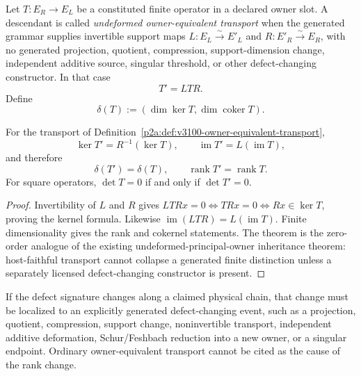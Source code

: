 \documentclass[12pt,a4paper]{article}
\begin{document}
\begin{definition}
\label{p2a:def:v3100-owner-equivalent-transport}
Let $T:E_R\to E_L$ be a constituted finite operator in a declared owner slot.
A descendant is called \emph{undeformed owner-equivalent transport} when the
generated grammar supplies invertible support maps
$L:E_L\overset{\sim}{\to}E'_L$ and
$R:E'_R\overset{\sim}{\to}E_R$, with no generated projection, quotient,
compression, support-dimension change, independent additive source, singular
threshold, or other defect-changing constructor.  In that case
\[
  T'=LTR.
\]
Define
\[
 \delta(T):=(\dim\ker T,\dim\operatorname{coker}T).
\]
\end{definition}

\begin{theorem}
\label{p2a:thm:v3100-same-owner-defect-inheritance}
For the transport of Definition~\ref{p2a:def:v3100-owner-equivalent-transport},
\[
 \ker T'=R^{-1}(\ker T),\qquad
 \operatorname{im}T'=L(\operatorname{im}T),
\]
and therefore
\[
 \boxed{\delta(T')=\delta(T)},\qquad
 \boxed{\operatorname{rank}T'=\operatorname{rank}T}.
\]
For square operators, $\det T=0$ if and only if $\det T'=0$.
\end{theorem}
\begin{proof}
Invertibility of $L$ and $R$ gives
$LTRx=0\Leftrightarrow TRx=0\Leftrightarrow Rx\in\ker T$, proving the
kernel formula.  Likewise $\operatorname{im}(LTR)=L(\operatorname{im}T)$.
Finite dimensionality gives the rank and cokernel statements.  The theorem is
the zero-order analogue of the existing undeformed-principal-owner
inheritance theorem: host-faithful transport cannot collapse a generated
finite distinction unless a separately licensed defect-changing constructor
is present.
\end{proof}

\begin{corollary}
\label{p2a:cor:v3100-defect-change-firewall}
If the defect signature changes along a claimed physical chain, that change
must be localized to an explicitly generated defect-changing event, such as a
projection, quotient, compression, support change, noninvertible transport,
independent additive deformation, Schur/Feshbach reduction into a new owner,
or a singular endpoint.  Ordinary owner-equivalent transport cannot be cited
as the cause of the rank change.
\end{corollary}
\end{document}
